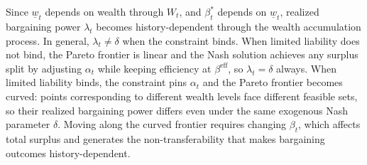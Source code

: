 \documentclass{article}
\theoremstyle{definition}
\theoremstyle{plain}
\begin{document}
Since $\underline{w}_t$ depends on wealth through $W_t$, and $\beta_t^*$ depends on $\underline{w}_t$, realized bargaining power $\lambda_t$ becomes history-dependent through the wealth accumulation process. In general, $\lambda_t \neq \delta$ when the constraint binds. When limited liability does not bind, the Pareto frontier is linear and the Nash solution achieves any surplus split by adjusting $\alpha_t$ while keeping efficiency at $\beta^{\text{eff}}$, so $\lambda_t = \delta$ always. When limited liability binds, the constraint pins $\alpha_t$ and the Pareto frontier becomes curved: points corresponding to different wealth levels face different feasible sets, so their realized bargaining power differs even under the same exogenous Nash parameter $\delta$. Moving along the curved frontier requires changing $\beta_t$, which affects total surplus and generates the non-transferability that makes bargaining outcomes history-dependent.
\end{document}
